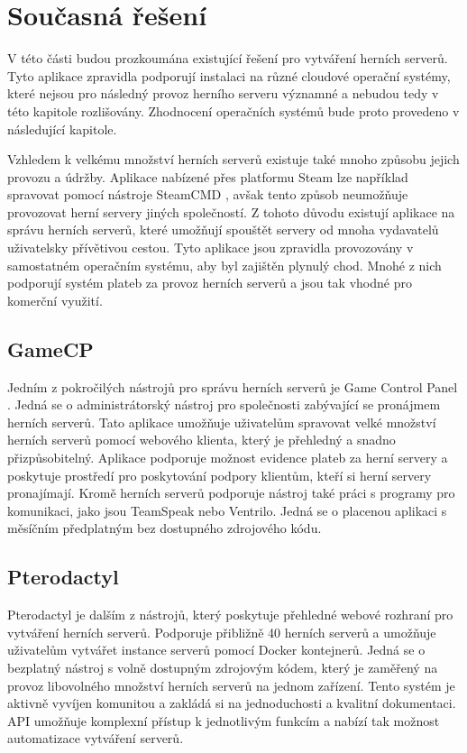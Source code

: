 \chapter[Současná řešení]{Současná řešení}

V této části budou prozkoumána existující řešení pro vytváření herních serverů. Tyto aplikace zpravidla podporují instalaci na různé cloudové operační systémy,
které nejsou pro následný provoz herního serveru významné a nebudou tedy v této kapitole rozlišovány. Zhodnocení operačních systémů bude proto provedeno v následující kapitole.

Vzhledem k velkému množství herních serverů existuje také mnoho způsobu jejich provozu a údržby. Aplikace nabízené přes platformu Steam
lze například spravovat pomocí nástroje SteamCMD \cite{steamcmd}, avšak tento způsob neumožňuje provozovat herní servery jiných společností.
Z tohoto důvodu existují aplikace na správu herních serverů, které umožňují spouštět servery od mnoha vydavatelů uživatelsky přívětivou cestou.
Tyto aplikace jsou zpravidla provozovány v samostatném operačním systému, aby byl zajištěn plynulý chod.
Mnohé z nich podporují systém plateb za provoz herních serverů a jsou tak vhodné pro komerční využití.

\section{GameCP}

Jedním z pokročilých nástrojů pro správu herních serverů je Game Control Panel \cite{gamecp}. Jedná se o administrátorský nástroj pro společnosti
zabývající se pronájmem herních serverů. Tato aplikace umožňuje uživatelům spravovat velké množství herních serverů pomocí webového klienta,
který je přehledný a snadno přizpůsobitelný. Aplikace podporuje možnost evidence plateb za herní servery a poskytuje prostředí pro poskytování
podpory klientům, kteří si herní servery pronajímají. Kromě herních serverů podporuje nástroj také práci s programy pro komunikaci, jako jsou TeamSpeak
nebo Ventrilo. Jedná se o placenou aplikaci s měsíčním předplatným bez dostupného zdrojového kódu.

\section{Pterodactyl}

Pterodactyl \cite{pterodactyl} je dalším z nástrojů, který poskytuje přehledné webové rozhraní pro vytváření herních serverů.
Podporuje přibližně 40 herních serverů a umožňuje uživatelům vytvářet instance serverů pomocí Docker kontejnerů. Jedná se o bezplatný nástroj
s volně dostupným zdrojovým kódem, který je zaměřený na provoz libovolného množství herních serverů na jednom zařízení. Tento systém je aktivně vyvíjen komunitou
a zakládá si na jednoduchosti a kvalitní dokumentaci. API umožňuje komplexní přístup k jednotlivým funkcím a nabízí tak možnost automatizace
vytváření serverů.

